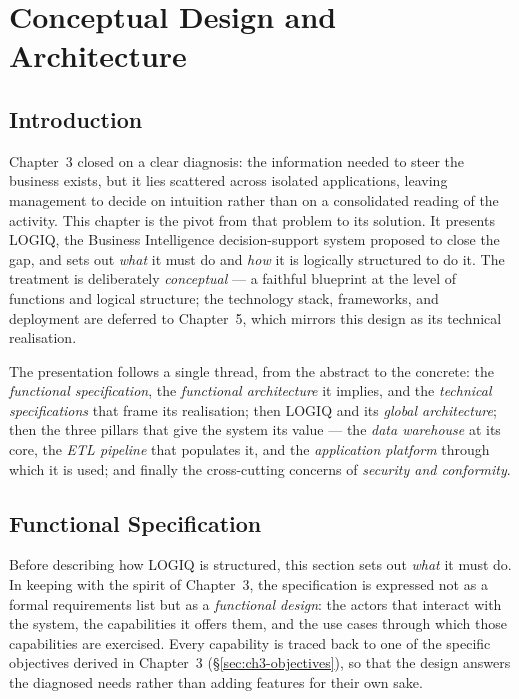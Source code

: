 \chapter{Conceptual Design and Architecture}

\section*{Introduction}

Chapter~3 closed on a clear diagnosis: the information needed to steer the business exists, but it
lies scattered across isolated applications, leaving management to decide on intuition rather than on a
consolidated reading of the activity. This chapter is the pivot from that problem to its solution. It
presents LOGIQ, the Business Intelligence decision-support system proposed to close the gap, and sets
out \emph{what} it must do and \emph{how} it is logically structured to do it. The treatment is
deliberately \emph{conceptual} --- a faithful blueprint at the level of functions and logical
structure; the technology stack, frameworks, and deployment are deferred to Chapter~5, which mirrors
this design as its technical realisation.

The presentation follows a single thread, from the abstract to the concrete: the \emph{functional
specification}, the \emph{functional architecture} it implies, and the \emph{technical specifications}
that frame its realisation; then LOGIQ and its \emph{global architecture}; then the three pillars that
give the system its value --- the \emph{data warehouse} at its core, the \emph{ETL pipeline} that
populates it, and the \emph{application platform} through which it is used; and finally the cross-cutting
concerns of \emph{security and conformity}.

\section{Functional Specification}
\label{sec:ch4-functional}

Before describing how LOGIQ is structured, this section sets out \emph{what} it must do. In keeping
with the spirit of Chapter~3, the specification is expressed not as a formal requirements list but as
a \emph{functional design}: the actors that interact with the system, the capabilities it offers
them, and the use cases through which those capabilities are exercised. Every capability is traced
back to one of the specific objectives derived in Chapter~3 (\S\ref{sec:ch3-objectives}), so that the
design answers the diagnosed needs rather than adding features for their own sake.


